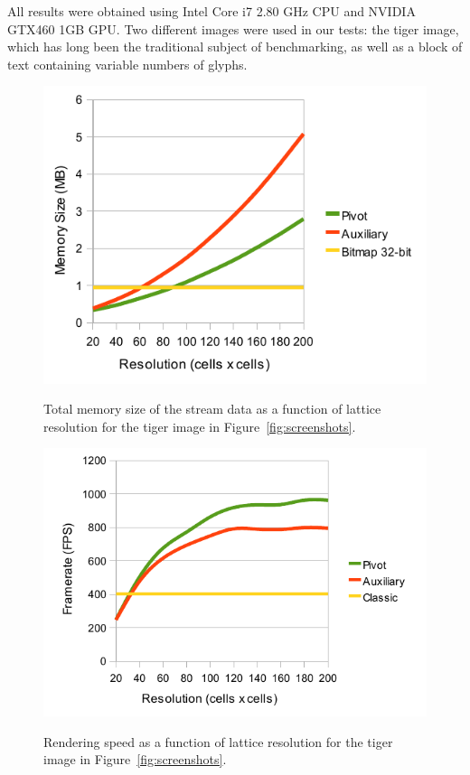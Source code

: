 \documentclass[11pt,a4paper,twoside]{article}
\begin{document}
All results were obtained using Intel Core i7 2.80 GHz CPU and NVIDIA GTX460 1GB GPU. Two different images were used in our tests: the tiger image, which has long been the traditional subject of benchmarking, as well as a block of text containing variable numbers of glyphs.

\begin {figure} [ht]
\centering
\begin {minipage} [b] {0.45\linewidth}
	\centering
	\includegraphics[width=1.0\columnwidth] {figures/graph_grid_memory}
	\caption {Total memory size of the stream data as a function of lattice resolution for the tiger image in Figure~\ref{fig:screenshots}.}
	\label {fig:graph_grid_memory}
\end {minipage}
\hspace{0.5cm}
\begin{minipage} [b] {0.45\linewidth}
	\centering
	\includegraphics[width=1.0\columnwidth] {figures/graph_grid_render}
	\caption {Rendering speed as a function of lattice resolution for the tiger image in Figure~\ref{fig:screenshots}.}
	\label {fig:graph_grid_render}
\end {minipage}
\end {figure}
\end{document}
